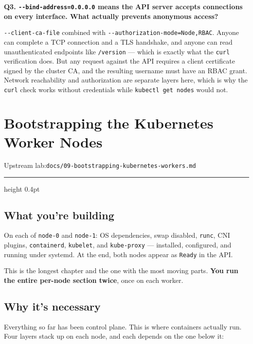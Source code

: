 \documentclass[11pt,oneside]{report}
\newcommand{\upstreamlab}[1]{%
  {\sffamily\footnotesize\color{steel}Upstream lab:\quad\texttt{#1}}\par\vspace{2pt}%
  {\color{rule}\hrule height 0.4pt}\vspace{8pt}}
\begin{document}
\textbf{Q3.
\texttt{-\/-bind-}\allowbreak{}\texttt{address=0.}\allowbreak{}\texttt{0.}\allowbreak{}\texttt{0.}\allowbreak{}\texttt{0}
means the API server
accepts connections
on every interface.
What actually
prevents anonymous
access?}

\texttt{-\/-client-}\allowbreak{}\texttt{ca-}\allowbreak{}\texttt{file}
combined with
\texttt{-\/-authorization-}\allowbreak{}\texttt{mode=Node,RBAC}.
Anyone can complete
a TCP connection and
a TLS handshake, and
anyone can read
unauthenticated
endpoints like
\texttt{/version}
--- which is exactly
what the
\texttt{curl}
verification does.
But any request
against the API
requires a client
certificate signed
by the cluster CA,
and the resulting
username must have
an RBAC grant.
Network reachability
and authorization
are separate layers
here, which is why
the \texttt{curl}
check works without
credentials while
\texttt{kubectl\ get\ nodes}
would not.

\hypertarget{chap-9}{%
\chapter{Bootstrapping
the Kubernetes
Worker
Nodes}\label{chap-9}}

\upstreamlab{docs/09-bootstrapping-kubernetes-workers.md}

\hypertarget{what-youre-building-9}{%
\section{What you're
building}\label{what-youre-building-9}}

On each of
\texttt{node-0} and
\texttt{node-1}: OS
dependencies, swap
disabled,
\texttt{runc}, CNI
plugins,
\texttt{containerd},
\texttt{kubelet},
and
\texttt{kube-proxy}
--- installed,
configured, and
running under
systemd. At the end,
both nodes appear as
\texttt{Ready} in
the API.

This is the longest
chapter and the one
with the most moving
parts. \textbf{You
run the entire
per-node section
twice}, once on each
worker.

\hypertarget{why-its-necessary-9}{%
\section{Why it's
necessary}\label{why-its-necessary-9}}

\begin{whybox}

Everything so far
has been control
plane. This is where
containers actually
run. Four layers
stack up on each
node, and each
depends on the one
below it:

\end{whybox}
\end{document}
